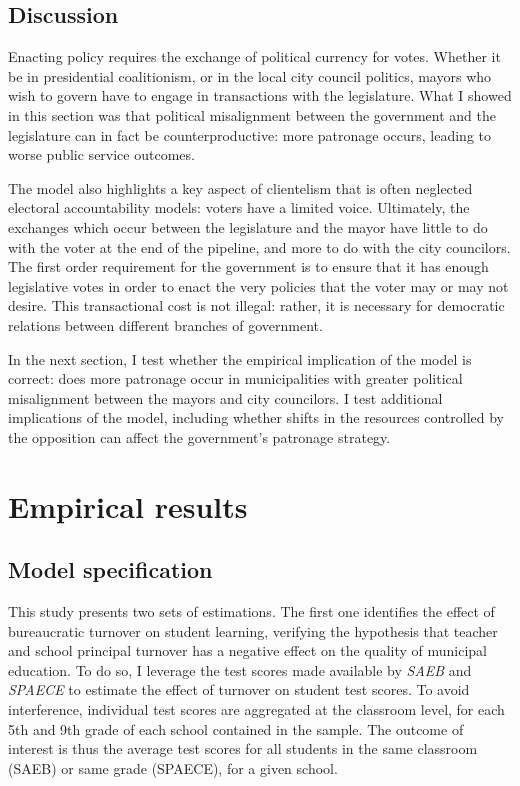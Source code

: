 \documentclass[12pt,a4paper]{article}
\begin{document}
\subsection*{Discussion}

Enacting policy requires the exchange of political currency for votes. Whether it be in presidential coalitionism, or in the local city council politics, mayors who wish to govern have to engage in transactions with the legislature. What I showed in this section was that political misalignment between the government and the legislature can in fact be counterproductive: more patronage occurs, leading to worse public service outcomes.

The model also highlights a key aspect of clientelism that is often neglected electoral accountability models: voters have a limited voice. Ultimately, the exchanges which occur between the legislature and the mayor have little to do with the voter at the end of the pipeline, and more to do with the city councilors. The first order requirement for the government is to ensure that it has enough legislative votes in order to enact the very policies that the voter may or may not desire. This transactional cost is not illegal: rather, it is necessary for democratic relations between different branches of government.

In the next section, I test whether the empirical implication of the model is correct: does more patronage occur in municipalities with greater political misalignment between the mayors and city councilors. I test additional implications of the model, including whether shifts in the resources controlled by the opposition can affect the government's patronage strategy.

\section{Empirical results}
\label{sec:empirics}

\subsection*{Model specification}

This study presents two sets of estimations. The first one identifies the effect of bureaucratic turnover on student learning, verifying the hypothesis that teacher and school principal turnover has a negative effect on the quality of municipal education. To do so, I leverage the test scores made available by \emph{SAEB} and \emph{SPAECE} to estimate the effect of turnover on student test scores. To avoid interference, individual test scores are aggregated at the classroom level, for each 5th and 9th grade of each school contained in the sample. The outcome of interest is thus the average test scores for all students in the same classroom (SAEB) or same grade (SPAECE), for a given school.
\end{document}
